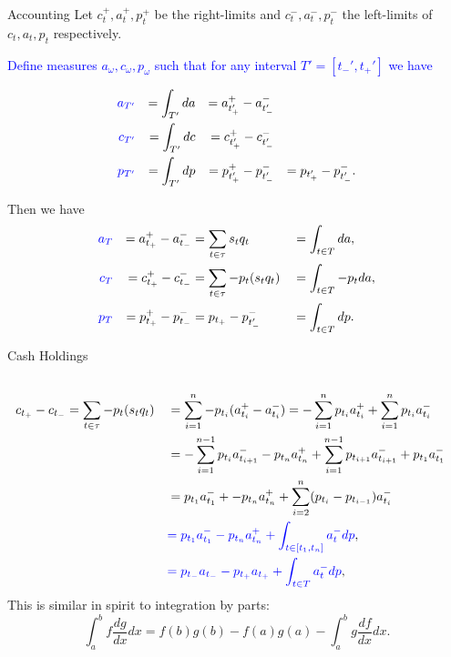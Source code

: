 \documentclass{beamer}
\begin{document}
\begin{frame}{Accounting}
	Let $c_t^+, a_t^+, p_t^+$ be the right-limits and $c_t^-, a_t^-, p_t^-$ the left-limits of $c_t,a_t, p_t$ respectively.

	\pause

	\textcolor{blue}{Define measures $a_\omega, c_\omega, p_\omega$ such that for any interval $T'=[t_-',t_+']$ we have}

	\vspace{-0.06\textheight}
	\begin{align*}
		\textcolor{blue}{a_{T'}} &&= \int_{T'} da &&= a_{t_+'}^+ - a_{t_-'}^-
	\\	\textcolor{blue}{c_{T'}} &&= \int_{T'} dc &&= c_{t_+'}^+ - c_{t_-'}^-
	\\	\textcolor{blue}{p_{T'}} &&= \int_{T'} dp &&= p_{t_+'}^+ - p_{t_-'}^- &&= p_{t_+'} - p_{t_-'}^-.
	\end{align*}%

	\pause

	Then we have
	\vspace{-0.04\textheight}
	\begin{align*}
		\textcolor{blue}{a_T}	&&= a_{t_+}^+ - a_{t_-}^- 	&= \sum_{t\in \tau} s_t q_t		&&= \int_{t\in T} da,
	\\	\textcolor{blue}{c_T}	&&= c_{t_+}^+ - c_{t_-}^- 	&= \sum_{t\in \tau} - p_t (s_t q_t)	&&= \int_{t\in T} - p_t da,
	\\	\textcolor{blue}{p_T}	&&= p_{t_+}^+ - p_{t_-}^- 	&= p_{t_+} - p_{t_-'}^-			&&= \int_{t\in T} dp.
	\end{align*}
\end{frame}

\begin{frame}{Cash Holdings}
	\vspace{-0.15\textheight}
	\begin{align*}
		\\	c_{t_+} - c_{t_-}	&= \sum_{t\in\tau} - p_t (s_t q_t)	&&= \sum_{i=1}^n - p_{t_i} (a_{t_i}^+-a_{t_i}^-) = - \sum_{i=1}^n p_{t_i} a_{t_i}^+ + \sum_{i=1}^n p_{t_i} a_{t_i}^-
		\\				&					&&= - \sum_{i=1}^{n-1} p_{t_i} a_{t_{i+1}}^- - p_{t_n} a_{t_n}^+ + \sum_{i=1}^{n-1} p_{t_{i+1}} a_{t_{i+1}}^- + p_{t_1}a_{t_1}^-
		\\				&					&&= p_{t_1}a_{t_1}^- + - p_{t_n} a_{t_n}^+ + \sum_{i=2}^n (p_{t_i}-p_{t_{i-1}}) a_{t_i}^-
		\\				&					&&\textcolor{blue}{= p_{t_1}a_{t_1}^- - p_{t_n}a_{t_n}^+ + \int_{t\in[t_1,t_n]} a_t^- dp},
		\\				&					&&\textcolor{blue}{= p_{t_-}a_{t_-} - p_{t_+}a_{t_+} + \int_{t\in T} a_t^- dp},
	\end{align*}
	This is similar in spirit to integration by parts:
	$$\int_a^b f \frac{dg}{dx} dx = f(b)g(b)-f(a)g(a) - \int_a^b g \frac{df}{dx} dx.$$
\end{frame}
\end{document}
